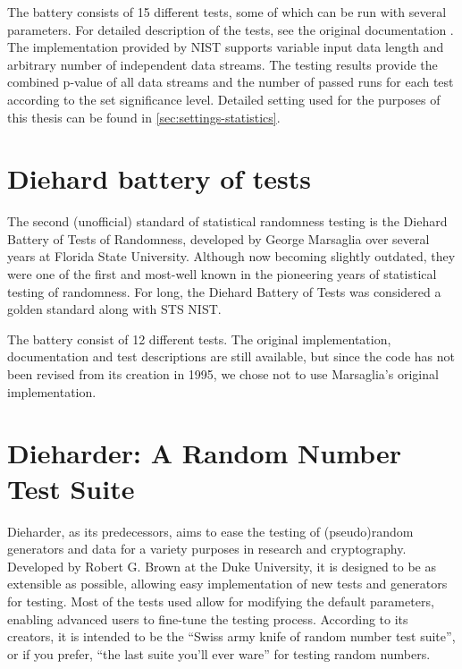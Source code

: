 \documentclass[12pt,oneside]{fithesis2}
\begin{document}
The battery consists of 15 different tests, some of which can be run with several parameters. 
For detailed description of the tests, see the original documentation \cite{sts nist documentation}. 
The implementation provided by NIST supports variable input data length and arbitrary number of independent data streams. 
The testing results provide the combined p-value of all data streams and the number of passed runs for each test 
according to the set significance level. 
Detailed setting used for the purposes of this thesis can be found in \autoref{sec:settings-statistics}.

\section{Diehard battery of tests}
\label{sec:diehard}

The second (unofficial) standard of statistical randomness testing is the Diehard Battery of Tests of Randomness, 
developed by George Marsaglia over several years at Florida State University. \cite{diehard website} 
Although now becoming slightly outdated, they were one of the first and most-well known 
in the pioneering years of statistical testing of randomness. 
For long, the Diehard Battery of Tests was considered a golden standard along with STS NIST.

The battery consist of 12 different tests. The original implementation, documentation and test descriptions are still available,
but since the code has not been revised from its creation in 1995, we chose not to use Marsaglia's original implementation.

\section{Dieharder: A Random Number Test Suite}
\label{sec:dieharder}

Dieharder, as its predecessors, aims to ease the testing of (pseudo)random generators and data for a variety purposes in research 
and cryptography. Developed by Robert G. Brown at the Duke University, it is designed to be as extensible as possible, 
allowing easy implementation of new tests and generators for testing. Most of the tests used allow for 
modifying the default parameters, enabling advanced users to fine-tune the testing process.
According to its creators, it is intended to be the ``Swiss army knife of random number test suite'', 
or if you prefer, ``the last suite you'll ever ware'' for testing random numbers. \cite{dieharder web}
\end{document}
